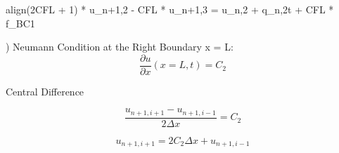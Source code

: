 \documentclass[10pt, letter, showtrims]{extarticle}
\newcommand{\boxedeq}[2]{\begin{empheq}[box={\fboxsep=6pt\fbox}]{align}\label{#1}#2\end{empheq}}
\begin{document}
		\boxedeq{}{(2CFL + 1) * u_{n+1,2} - CFL * u_{n+1,3} = u_{n,2} + q_{n,2}\Delta t + CFL * f_{BC1}} 
		
		) Neumann Condition at the Right Boundary x = L: \\
		
		\begin{equation}
			\frac{\partial u}{\partial x}(x=L, t) = C_{2}
    		\end{equation}
%    		
%    		
%    		
%    		
%    		
%    		
%    		
%    		
%    		
%    		
    		
    		\noindent
    		Central Difference
    		
    		\begin{equation}
    			\frac{u_{n+1,i+1} - u_{n+1,i-1}}{2 \Delta x} = C_{2}
    		\end{equation}
    		
    		\begin{equation}
    			u_{n+1,i+1} = 2 C_{2} \Delta x + u_{n+1,i-1}
    		\end{equation}
    		
\end{document}
